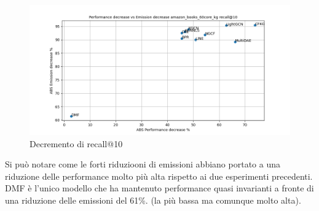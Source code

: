 \begin{figure}[H]
    \centering
    \includegraphics[scale=0.5]{images/decrement_recall@10_amazon_books_60core_kg.png}
    \caption{Decremento di recall@10}
\end{figure}
\noindent Si può notare come le forti riduziooni di emissioni abbiano portato a una riduzione delle performance molto più alta rispetto ai due esperimenti precedenti.
DMF è l'unico modello che ha mantenuto performance quasi invarianti a fronte di una riduzione delle emissioni del 61\%. (la più bassa ma comunque molto alta).
    

